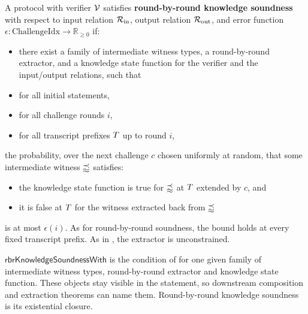 \begin{definition}
    \label{def:round_by_round_knowledge_soundness}
    A protocol with verifier \(\mathcal{V}\) satisfies \textbf{round-by-round knowledge soundness} with respect to input
    relation \(\mathcal{R}_{\mathrm{in}}\), output relation \(\mathcal{R}_{\mathrm{out}}\), and error function \(\epsilon: \text{ChallengeIdx} \to \mathbb{R}_{\geq 0}\) if:
    \begin{itemize}
        \item there exist a family of intermediate witness types, a round-by-round extractor, and a
        knowledge state function for the verifier and the input/output relations, such that
        \item for all initial statements,
        \item for all challenge rounds \(i\),
        \item for all transcript prefixes \(T\) up to round \(i\),
    \end{itemize}
    the probability, over the next challenge \(c\) chosen uniformly at random, that some
    intermediate witness \(\mathbb{w}\) satisfies:
    \begin{itemize}
        \item the knowledge state function is true for \(\mathbb{w}\) at \(T\) extended by \(c\), and
        \item it is false at \(T\) for the witness extracted back from \(\mathbb{w}\)
    \end{itemize}
    is at most \(\epsilon(i)\). As for round-by-round soundness, the bound holds at every fixed
    transcript prefix. As in , the extractor is unconstrained.
    \leanok
\end{definition}

\begin{definition}
    \label{def:round_by_round_knowledge_soundness_with}
    \(\mathsf{rbrKnowledgeSoundnessWith}\) is the condition of
     for one given family of intermediate witness
    types, round-by-round extractor and knowledge state function. These objects stay visible in the
    statement, so downstream composition and extraction theorems can name them. Round-by-round
    knowledge soundness is its existential closure.
    \leanok
\end{definition}

